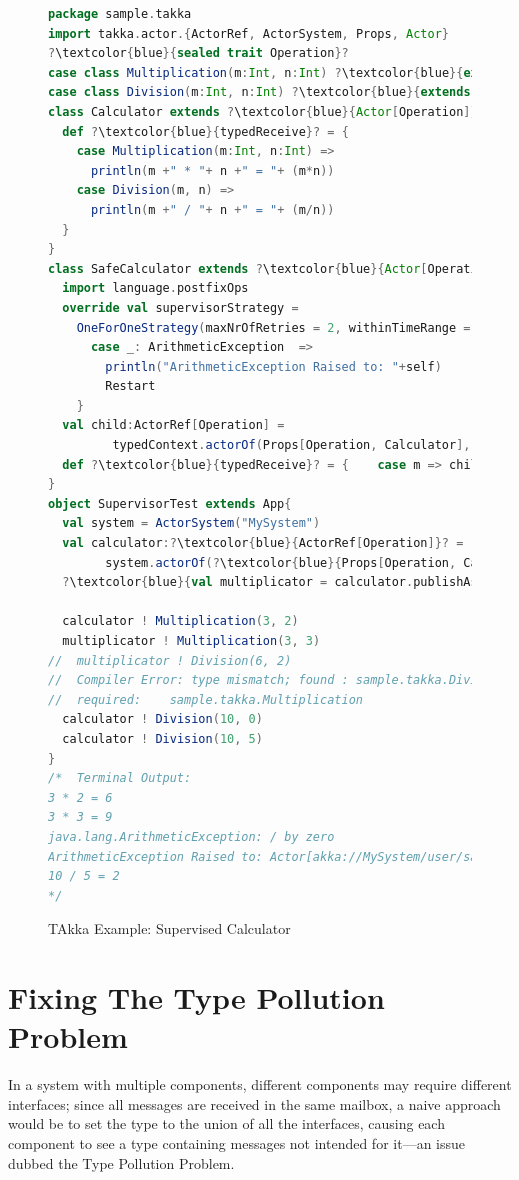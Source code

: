 \begin{figure}[p]
    \begin{lstlisting}[language=scala, escapechar=?]
package sample.takka
import takka.actor.{ActorRef, ActorSystem, Props, Actor}
?\textcolor{blue}{sealed trait Operation}?
case class Multiplication(m:Int, n:Int) ?\textcolor{blue}{extends Operation}?
case class Division(m:Int, n:Int) ?\textcolor{blue}{extends Operation}?
class Calculator extends ?\textcolor{blue}{Actor[Operation]}? {
  def ?\textcolor{blue}{typedReceive}? = {
    case Multiplication(m:Int, n:Int) =>
      println(m +" * "+ n +" = "+ (m*n))    
    case Division(m, n) =>
      println(m +" / "+ n +" = "+ (m/n))
  }
}
class SafeCalculator extends ?\textcolor{blue}{Actor[Operation]}? {
  import language.postfixOps
  override val supervisorStrategy =
    OneForOneStrategy(maxNrOfRetries = 2, withinTimeRange = 1 minute) {
      case _: ArithmeticException  =>
        println("ArithmeticException Raised to: "+self)
        Restart
    }
  val child:ActorRef[Operation] = 
         typedContext.actorOf(Props[Operation, Calculator], "child")
  def ?\textcolor{blue}{typedReceive}? = {    case m => child ! m  }
}
object SupervisorTest extends App{
  val system = ActorSystem("MySystem")
  val calculator:?\textcolor{blue}{ActorRef[Operation]}? = 
        system.actorOf(?\textcolor{blue}{Props[Operation, Calculator]}?, "calculator")
  ?\textcolor{blue}{val multiplicator = calculator.publishAs[Multiplication]}?
  
  calculator ! Multiplication(3, 2)
  multiplicator ! Multiplication(3, 3)
//  multiplicator ! Division(6, 2)  
//  Compiler Error: type mismatch; found : sample.takka.Division 
//  required: 	 sample.takka.Multiplication
  calculator ! Division(10, 0)
  calculator ! Division(10, 5)
}  
/*  Terminal Output:
3 * 2 = 6
3 * 3 = 9
java.lang.ArithmeticException: / by zero
ArithmeticException Raised to: Actor[akka://MySystem/user/safecalculator]
10 / 5 = 2
*/
    \end{lstlisting}
    \caption{TAkka Example: Supervised Calculator}
    \label{takka_safe_calculator}
\end{figure}

\newpage

\section{Fixing The Type Pollution Problem}
\label{type_pollution}

In a system with multiple components, different components may require
different interfaces; since all messages are received in the same
mailbox, a naive approach would be to set the type to the union of all
the interfaces, causing each component to see a type containing
messages not intended for it---an issue dubbed the Type Pollution
Problem.

